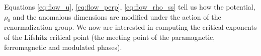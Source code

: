 Equations \ref{eq:flow_u}, \ref{eq:flow_perp}, \ref{eq:flow_rho_ss} tell us how the potential, $\rho_0$ and the anomalous dimensions are modified under the action of the renormalization group. We now are interested in computing the critical exponents of the Lifshitz critical point (the meeting point of the paramagnetic, ferromagnetic and modulated phases). 